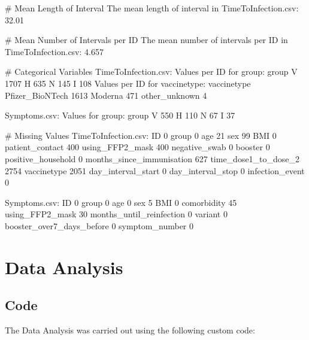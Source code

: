 \documentclass[11pt]{article}
\begin{document}
\begin{codeoutput}
\# Mean Length of Interval
The mean length of interval in TimeToInfection.csv: 32.01            

\# Mean Number of Intervals per ID
The mean number of intervals per ID in TimeToInfection.csv: 4.657            

\# Categorical Variables
TimeToInfection.csv:
Values per ID for group: 
group
V    1707
H     635
N     145
I     108
Values per ID for vaccinetype: 
vaccinetype
Pfizer\_BioNTech    1613
Moderna             471
other\_unknown         4

Symptoms.csv:
Values for group:
group
V    550
H    110
N     67
I     37

\# Missing Values
TimeToInfection.csv:
ID                              0
group                           0
age                            21
sex                            99
BMI                             0
patient\_contact               400
using\_FFP2\_mask               400
negative\_swab                   0
booster                         0
positive\_household              0
months\_since\_immunisation     627
time\_dose1\_to\_dose\_2         2754
vaccinetype                  2051
day\_interval\_start              0
day\_interval\_stop               0
infection\_event                 0

Symptoms.csv:
ID                            0
group                         0
age                           0
sex                           5
BMI                           0
comorbidity                  45
using\_FFP2\_mask              30
months\_until\_reinfection      0
variant                       0
booster\_over7\_days\_before     0
symptom\_number                0
\end{codeoutput}

\section{Data Analysis}
\subsection{{Code}}
The Data Analysis was carried out using the following custom code:
\end{document}
